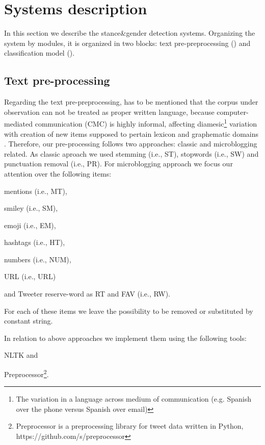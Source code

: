 \section{Systems description} \label{sec:system}

In this section we describe the stance\&gender detection systems. Organizing the system by modules, it is organized in two blocks: text pre-preprocessing () and classification model (). 


\subsection{Text pre-processing} \label{subsec:preprocessing}
Regarding the text pre-preprocessing, has to be mentioned that the corpus under observation can not be treated as proper written language, because computer-mediated communication (CMC) is highly informal, affecting diamesic\footnote{The variation in a language across medium of communication (e.g. Spanish over the phone versus Spanish over email)} variation with creation of new items supposed to pertain lexicon and graphematic domains \cite{bazzanella2011oscillazioni,cerruti2013netspeak}.
Therefore, our pre-processing follows two approaches: classic and microblogging related.
As classic aproach we used stemming (i.e., ST), stopwords (i.e., SW) and punctuation removal (i.e., PR).
For microblogging approach we focus our attention over the following items:
\begin{enumerate*}
\item mentions (i.e., MT),
\item smiley (i.e., SM),
\item emoji (i.e., EM),
\item hashtags (i.e., HT),
\item numbers (i.e., NUM),
\item URL (i.e., URL)
\item and Tweeter reserve-word as RT and FAV (i.e., RW).
\end{enumerate*}
For each of these items we leave the possibility to be removed or substituted by constant string.

In relation to above approaches we implement them using the following tools:
\begin{enumerate*}
\item NLTK \cite{nltk} and 
\item Preprocessor\footnote{Preprocessor is a preprocessing library for tweet data written in Python, https://github.com/s/preprocessor}.
\end{enumerate*}



